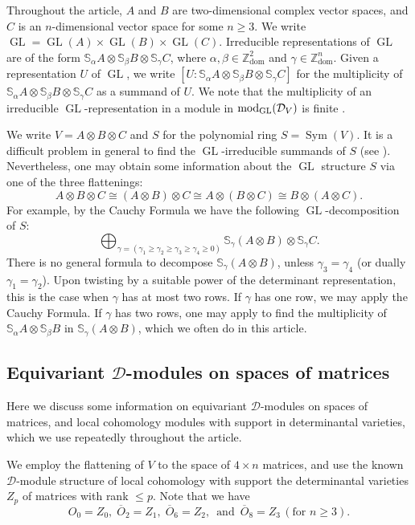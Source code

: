 \documentclass[11pt,reqno]{amsart}
\newcommand{\D}{\mathcal{D}}
\newcommand{\oo}{\otimes}
\newcommand{\bS}{\mathbb{S}}
\newcommand{\tn}{\textnormal}
\newcommand{\GL}{\operatorname{GL}}
\newcommand{\Sym}{\operatorname{Sym}}
\newcommand{\dom}{\operatorname{dom}}
\numberwithin{equation}{section}
\begin{document}
Throughout the article, $A$ and $B$ are two-dimensional complex vector spaces, and $C$ is an $n$-dimensional vector space for some $n\geq 3$. We write $\GL=\GL(A)\times \GL(B)\times \GL(C)$. Irreducible representations of $\GL$ are of the form $\bS_{\alpha}A\oo \bS_{\beta}B\oo \bS_{\gamma}C$, where $\alpha,\beta\in \mathbb{Z}^2_{\dom}$ and $\gamma\in \mathbb{Z}^n_{\dom}$. Given a representation $U$ of $\GL$, we write $[U:\bS_{\alpha}A\oo \bS_{\beta}B\oo \bS_{\gamma}C]$ for the multiplicity of $\bS_{\alpha}A\oo \bS_{\beta}B\oo \bS_{\gamma}C$ as a summand of $U$. We note that the multiplicity of an irreducible $\GL$-representation in a module in $\tn{mod}_{\GL}(\D_V)$ is finite \cite[Proposition 3.14]{lHorincz2019categories}. 

We write $V=A\oo B\oo C$ and $S$ for the polynomial ring $S=\Sym(V)$. It is a difficult problem in general to find the $\GL$-irreducible summands of $S$ (see \cite[pg. 60-61]{weyman}). Nevertheless, one may obtain some information about the $\GL$ structure $S$ via one of the three flattenings:
$$
A\otimes B\otimes C\cong (A\otimes B)\otimes C\cong A\oo(B\oo C)\cong B\oo(A\oo C).
$$
For example, by the Cauchy Formula \cite[Theorem 2.3.2]{weyman} we have the following $\GL$-decomposition of $S$:
$$
\bigoplus_{\gamma=(\gamma_1\geq \gamma_2\geq \gamma_3\geq\gamma_4\geq 0)} \bS_{\gamma}(A\oo B)\otimes \bS_{\gamma}C.
$$
There is no general formula to decompose $\bS_{\gamma}(A\oo B)$, unless $\gamma_3=\gamma_4$ (or dually $\gamma_1=\gamma_2$). Upon twisting by a suitable power of the determinant representation, this is the case when $\gamma$ has at most two rows. If $\gamma$ has one row, we may apply the Cauchy Formula. If $\gamma$ has two rows, one may apply \cite[Corollary 4.3b]{raicu2012secant} to find the multiplicity of $\bS_{\alpha}A\oo \bS_{\beta}B$ in $\bS_{\gamma}(A\oo B)$, which we often do in this article. 

 


\subsection{Equivariant $\D$-modules on spaces of matrices}\label{sec:dmodsMat} Here we discuss some information on equivariant $\D$-modules on spaces of matrices, and local cohomology modules with support in determinantal varieties, which we use repeatedly throughout the article.

We employ the flattening of $V$ to the space of $4\times n$ matrices, and use the known $\D$-module structure of local cohomology with support the determinantal varieties $Z_p$ of matrices with rank $\leq p$. Note that we have
\begin{equation} \label{eq:detorbits}
O_0=Z_0, \; \overline{O}_2=Z_1, \; \overline{O}_6=Z_2, \, \mbox{ and }\, \overline{O}_8=Z_3 \, (\mbox{for } n\geq 3). 
\end{equation}
\end{document}

